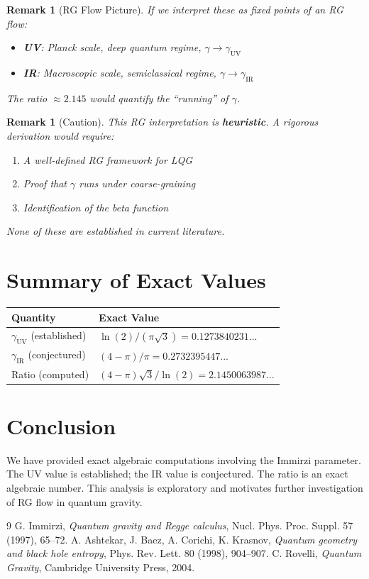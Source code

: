 \documentclass[11pt,a4paper]{article}
\theoremstyle{plain}
\newtheorem{remark}[theorem]{Remark}
\begin{document}
\begin{remark}[RG Flow Picture]
If we interpret these as fixed points of an RG flow:
\begin{itemize}
    \item \textbf{UV}: Planck scale, deep quantum regime, $\gamma \to \gamma_{\text{UV}}$
    \item \textbf{IR}: Macroscopic scale, semiclassical regime, $\gamma \to \gamma_{\text{IR}}$
\end{itemize}
The ratio $\approx 2.145$ would quantify the ``running'' of $\gamma$.
\end{remark}

\begin{remark}[Caution]
This RG interpretation is \textbf{heuristic}. A rigorous derivation would require:
\begin{enumerate}
    \item A well-defined RG framework for LQG
    \item Proof that $\gamma$ runs under coarse-graining
    \item Identification of the beta function
\end{enumerate}
None of these are established in current literature.
\end{remark}

\section{Summary of Exact Values}

\begin{center}
\begin{tabular}{ll}
\hline
Quantity & Exact Value \\
\hline
$\gamma_{\text{UV}}$ (established) & $\ln(2)/(\pi\sqrt{3}) = 0.1273840231...$ \\
$\gamma_{\text{IR}}$ (conjectured) & $(4-\pi)/\pi = 0.2732395447...$ \\
Ratio (computed) & $(4-\pi)\sqrt{3}/\ln(2) = 2.1450063987...$ \\
\hline
\end{tabular}
\end{center}

\section{Conclusion}

We have provided exact algebraic computations involving the Immirzi parameter. The UV value is established; the IR value is conjectured. The ratio is an exact algebraic number. This analysis is exploratory and motivates further investigation of RG flow in quantum gravity.

\begin{thebibliography}{9}
 G. Immirzi, \textit{Quantum gravity and Regge calculus}, Nucl. Phys. Proc. Suppl. 57 (1997), 65--72.
 A. Ashtekar, J. Baez, A. Corichi, K. Krasnov, \textit{Quantum geometry and black hole entropy}, Phys. Rev. Lett. 80 (1998), 904--907.
 C. Rovelli, \textit{Quantum Gravity}, Cambridge University Press, 2004.
\end{thebibliography}
\end{document}
